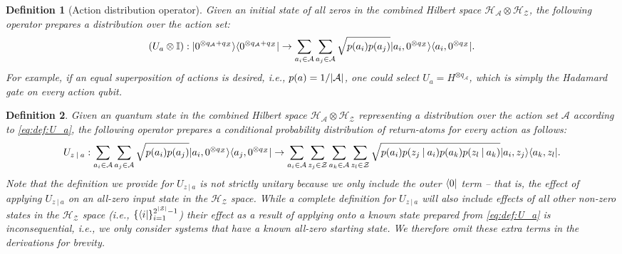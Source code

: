 \documentclass{article}
\newtheorem{definition}{Definition}[section]
\DeclarePairedDelimiter{\bra}{\langle}{\rvert} %
\DeclarePairedDelimiter{\ket}{\lvert}{\rangle} %
\DeclarePairedDelimiter{\abs}{\lvert}{\rvert} %
\DeclarePairedDelimiter{\paren}{\lparen}{\rparen} %
\newcommand{\hilbert}{\mathcal{H}} %
\newcommand{\given}[1][]{\:#1\vert\:}
\begin{document}
\begin{definition}[Action distribution operator]
Given an initial state of all zeros in the combined Hilbert space $\hilbert_{\mathcal{A}} \otimes \hilbert_{\mathcal{Z}}$, the following operator prepares a distribution over the action set:
%
\begin{equation}\label{eq:def:U_a}
\paren*{U_{a} \otimes \mathbb{I}}
% 
: \ket{0^{\otimes q_{\mathcal{A}} + q_{\mathcal{Z}}}}\bra{0^{\otimes q_{\mathcal{A}} + q_{\mathcal{Z}}}} 
% 
\to \sum_{a_i \in \mathcal{A}} \sum_{a_j \in \mathcal{A}} \sqrt{p(a_i) p(a_j)} \ket{a_i, 0^{\otimes q_{\mathcal{Z}}}} \bra{a_i, 0^{\otimes q_{\mathcal{Z}}}}.
\end{equation}
% 
For example, if an equal superposition of actions is desired, i.e., $p(a) = 1/\abs{\mathcal{A}}$, one could select $U_{a} = H^{\otimes q_{\mathcal{A}}}$, which is simply the Hadamard gate on every action qubit.
\end{definition}

\begin{definition}
Given an quantum state in the combined Hilbert space $\hilbert_{\mathcal{A}} \otimes \hilbert_{\mathcal{Z}}$ representing a distribution over the action set $\mathcal{A}$ according to \cref{eq:def:U_a}, the following operator prepares a conditional probability distribution of return-atoms for every action as follows:
% 
\begin{equation}\label{eq:def:U_z_a}
U_{z \given a} 
% 
: \sum_{a_i \in \mathcal{A}} \sum_{a_j \in \mathcal{A}} \sqrt{p(a_i) p(a_j)} \ket{a_i, 0^{\otimes q_{\mathcal{Z}}}} \bra{a_j, 0^{\otimes q_{\mathcal{Z}}}} 
% 
\to \sum_{a_i \in \mathcal{A}} \sum_{z_j \in \mathcal{Z}} \sum_{a_k \in \mathcal{A}} \sum_{z_l \in \mathcal{Z}} \sqrt{p(a_i) p(z_j \given a_i) p(a_k) p(z_l \given a_k)} \ket{a_i, z_j} \bra{a_k, z_l}.
\end{equation}
% 
Note that the definition we provide for $U_{z \given a}$ is not strictly unitary because we only include the outer $\bra{0}$ term -- that is, the effect of applying $U_{z \given a}$ on an all-zero input state in the $\hilbert_{\mathcal{Z}}$ space. While a complete definition for $U_{z \given a}$ will also include effects of all other non-zero states in the $\hilbert_{\mathcal{Z}}$ space (i.e., $\{\bra{i}\}_{i=1}^{2^{\abs{\mathcal{Z}}}-1}$) their effect as a result of applying onto a known state prepared from \cref{eq:def:U_a} is inconsequential, i.e., we only consider systems that have a known all-zero starting state. We therefore omit these extra terms in the derivations for brevity.

\end{definition}
\end{document}
